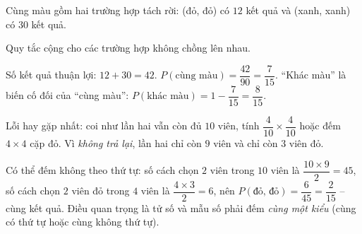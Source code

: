 {
Cùng màu gồm hai trường hợp tách rời: (đỏ, đỏ) có $12$ kết quả và (xanh, xanh) có $30$ kết quả.
\begin{recallbox}Quy tắc cộng cho các trường hợp không chồng lên nhau.\end{recallbox}
Số kết quả thuận lợi: $12+30=42$. $P(\text{cùng màu})=\dfrac{42}{90}=\dfrac{7}{15}$.
``Khác màu'' là biến cố đối của ``cùng màu'': $P(\text{khác màu})=1-\dfrac{7}{15}=\dfrac{8}{15}$.
\begin{warnbox}Lỗi hay gặp nhất: coi như lần hai vẫn còn đủ $10$ viên, tính $\dfrac{4}{10}\times\dfrac{4}{10}$ hoặc đếm $4\times4$ cặp đỏ. Vì \emph{không trả lại}, lần hai chỉ còn $9$ viên và chỉ còn $3$ viên đỏ.\end{warnbox}
\begin{tipbox}Có thể đếm không theo thứ tự: số cách chọn $2$ viên trong $10$ viên là $\dfrac{10\times9}{2}=45$, số cách chọn $2$ viên đỏ trong $4$ viên là $\dfrac{4\times3}{2}=6$, nên $P(\text{đỏ, đỏ})=\dfrac{6}{45}=\dfrac{2}{15}$ -- cùng kết quả. Điều quan trọng là tử số và mẫu số phải đếm \emph{cùng một kiểu} (cùng có thứ tự hoặc cùng không thứ tự).\end{tipbox}
}
